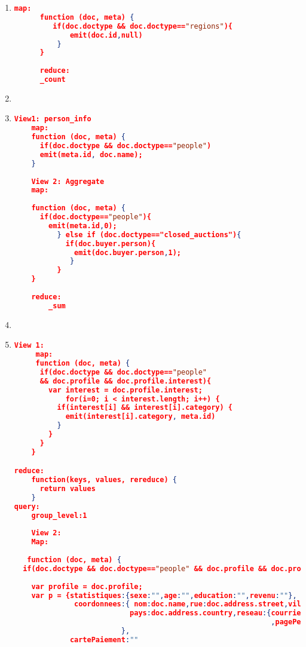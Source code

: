 \begin{enumerate}[label=Q\arabic*.]
    \item %
	\begin{lstlisting}[language=JSON, basicstyle=\scriptsize]
	  map:
	  function (doc, meta) {
	     if(doc.doctype && doc.doctype=="regions"){
	         emit(doc.id,null)
	      }
	  }
	  
	  reduce: 
	  _count
	\end{lstlisting}
	
	
    \item %
    \par
	
	
    \item %
	\begin{lstlisting}[language=JSON, basicstyle=\scriptsize]
	View1: person_info
	map:
	function (doc, meta) {
      if(doc.doctype && doc.doctype=="people")
      emit(meta.id, doc.name);
    }
    
    View 2: Aggregate
    map:
    
    function (doc, meta) {
      if(doc.doctype=="people"){
        emit(meta.id,0);
          } else if (doc.doctype=="closed_auctions"){
            if(doc.buyer.person){
              emit(doc.buyer.person,1);
             }
          }
    }
    
    reduce: 
        _sum
	\end{lstlisting}
	
	
    \item %
\par
	
	
    \item %
	\begin{lstlisting}[language=JSON, basicstyle=\scriptsize]
	  View 1: 
	 map:
	 function (doc, meta) {
      if(doc.doctype && doc.doctype=="people" 
      && doc.profile && doc.profile.interest){
        var interest = doc.profile.interest;
            for(i=0; i < interest.length; i++) {
          if(interest[i] && interest[i].category) {
            emit(interest[i].category, meta.id) 
          }
        }
      }
    }

reduce:
    function(keys, values, rereduce) {
      return values
    }
query:
    group_level:1
	   
    View 2: 
    Map: 
    
   function (doc, meta) {
  if(doc.doctype && doc.doctype=="people" && doc.profile && doc.profile.interest){
  
    var profile = doc.profile;
    var p = {statistiques:{sexe:"",age:"",education:"",revenu:""},
              coordonnees:{ nom:doc.name,rue:doc.address.street,ville:doc.address.city,
                           pays:doc.address.country,reseau:{courrier:doc.emailaddress
                                                            ,pagePerso:doc.homepage}
                         },
             cartePaiement:""
            

\end{lstlisting}
\end{enumerate}
